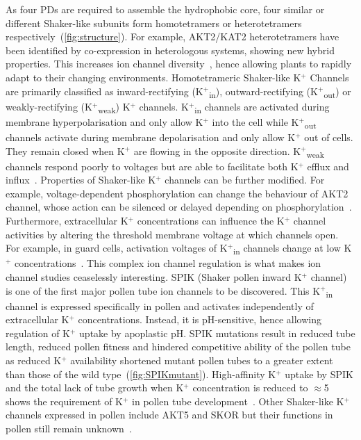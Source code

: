 \documentclass[11pt]{article}
\begin{document}
\begin{multicols*}{2}
As four PDs are required to assemble the hydrophobic core, four similar or different Shaker-like subunits form homotetramers or heterotetramers respectively~(\autoref{fig:structure}). For example, AKT2/KAT2 heterotetramers have been identified by co-expression in heterologous systems, showing new hybrid properties. This increases ion channel diversity~\citep{Xicluna2007}, hence allowing plants to rapidly adapt to their changing environments. 
\newline\newline
Homotetrameric Shaker-like K$^{+}$ Channels are primarily classified as inward-rectifying (K$^{+}$\textsubscript{in}), outward-rectifying (K$^{+}$\textsubscript{out}) or weakly-rectifying (K$^{+}$\textsubscript{weak}) K$^{+}$ channels. K$^{+}$\textsubscript{in} channels are activated during membrane hyperpolarisation and only allow K$^{+}$ into the cell while K$^{+}$\textsubscript{out} channels activate during membrane depolarisation and only allow K$^{+}$ out of cells. They remain closed when K$^{+}$ are flowing in the opposite direction. K$^{+}$\textsubscript{weak} channels respond poorly to voltages but are able to facilitate both K$^{+}$ efflux and influx~\citep{Dreyer2009}. 
\newline\newline
Properties of Shaker-like K$^{+}$ channels can be further modified. For example, voltage-dependent phosphorylation can change the behaviour of AKT2 channel, whose action can be silenced or delayed depending on phosphorylation~\citep{Dreyer2001,Michard2005a}. Furthermore, extracellular K$^{+}$ concentrations can influence the K$^{+}$ channel activities by altering the threshold membrane voltage at which channels open. For example, in guard cells, activation voltages of K$^{+}$\textsubscript{in} channels change at low K$^{+}$ concentrations~\citep{Schroeder1991}. This complex ion channel regulation is what makes ion channel studies ceaselessly interesting. 
\newline\newline
SPIK (Shaker pollen inward K$^{+}$ channel) is one of the first major pollen tube ion channels to be discovered. This K$^{+}$\textsubscript{in} channel is expressed specifically in pollen and activates independently of extracellular K$^{+}$ concentrations. Instead, it is pH-sensitive, hence allowing regulation of K$^{+}$ uptake by apoplastic pH. SPIK mutations result in reduced tube length, reduced pollen fitness and hindered competitive ability of the pollen tube as reduced K$^{+}$ availability shortened mutant pollen tubes to a greater extent than those of the wild type~(\autoref{fig:SPIKmutant}). High-affinity K$^{+}$ uptake by SPIK and the total lack of tube growth when K$^{+}$ concentration is reduced to $\approx$5\,\SI{}{\micro\Molar} shows the requirement of K$^{+}$ in pollen tube development~\citep{Mouline2002}. Other Shaker-like K$^{+}$ channels expressed in pollen include AKT5 and SKOR but their functions in pollen still remain unknown~\citep{Chen2008}. 


\end{multicols*}
\end{document}
